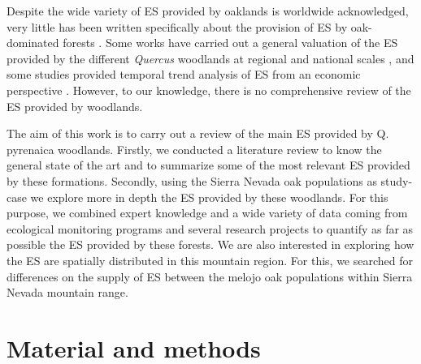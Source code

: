 Despite the wide variety of ES provided by oaklands is worldwide acknowledged, very little has been written specifically about the provision of ES by oak-dominated forests  \autocites{Maranonetal2012OakTrees,Maranonetal2012EstadoTendencia,MorenoLlorcaetal2012MontanaMediterranea}. Some works have carried out a general valuation of the ES provided by the different \emph{Quercus} woodlands at regional and national scales \autocite{SanMigueletal2012BosquesMatorrales,Maranonetal2012EstadoTendencia,Sousaetal2020EcosystemServices}, and some studies provided temporal trend analysis of ES from an economic perspective \autocites[see][for an example for dehesas of California and Spain]{Caparrosetal2013EconomicsEcosystem}. However, to our knowledge, there is no comprehensive review of the ES provided by \Qp woodlands. 

The aim of this work is to carry out a review of the main ES provided by Q. pyrenaica woodlands. Firstly, we conducted a literature review to know the general state of the art and to summarize some of the most relevant ES provided by these formations. Secondly, using the Sierra Nevada oak populations as study-case we explore more in depth the ES provided by these woodlands. For this purpose, we combined expert knowledge and a wide variety of data coming from ecological monitoring programs and several research projects to quantify as far as possible the ES provided by these forests. We are also interested in exploring how the ES are spatially distributed in this mountain region. For this, we searched for differences on the supply of ES between the melojo oak populations within Sierra Nevada mountain range.  

\section{Material and methods}\label{sec:es:mat}
